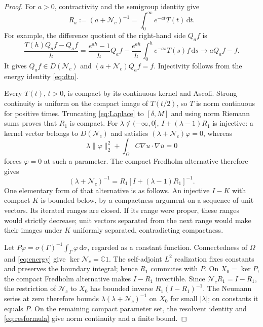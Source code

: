 \documentclass[11pt]{article}
\newcommand{\C}{\mathbb C}
\newcommand{\Nc}{\mathcal N_c}
\newcommand{\dd}{\,\mathrm d}
\newcommand{\norm}[1]{\lVert #1\rVert}
\newcommand{\abs}[1]{\lvert #1\rvert}
\begin{document}
\begin{proof}
For $a>0$, contractivity and the semigroup identity give
\begin{equation}\label{eq:Laplace}
 R_a:=(a+\Nc)^{-1}=\int_0^\infty e^{-at}T(t)\dd t.
\end{equation}
For example, the difference quotient of the right-hand side $Q_af$ is
\[
 \frac{T(h)Q_af-Q_af}{h}
 =\frac{e^{ah}-1}{h}Q_af-\frac{e^{ah}}h\int_0^h e^{-as}T(s)f\dd s
 \longrightarrow aQ_af-f.
\]
It gives $Q_af\in D(\Nc)$ and $(a+\Nc)Q_af=f$. Injectivity follows from
the energy identity \eqref{eq:dtn}.

Every $T(t)$, $t>0$, is compact by its continuous kernel and Ascoli.
Strong continuity is uniform on the compact image of $T(t/2)$, so $T$ is
norm continuous for positive times. Truncating \eqref{eq:Laplace} to
$[\delta,M]$ and using norm Riemann sums proves that $R_1$ is compact.
For $\lambda\notin(-\infty,0]$, $I+(\lambda-1)R_1$ is injective: a kernel
vector belongs to $D(\Nc)$ and satisfies $(\lambda+\Nc)\varphi=0$, whereas
\begin{equation}\label{eq:energy}
 \lambda\norm\varphi_2^2+\int_\Omega C\nabla u\cdot\nabla\overline u=0
\end{equation}
forces $\varphi=0$ at such a parameter.
The compact Fredholm alternative therefore gives
\begin{equation}\label{eq:resformula}
 (\lambda+\Nc)^{-1}=R_1[I+(\lambda-1)R_1]^{-1}.
\end{equation}
One elementary form of that alternative is as follows. An injective $I-K$
with compact $K$ is bounded below, by a compactness argument on a sequence
of unit vectors. Its iterated ranges are closed. If its range were proper,
these ranges would strictly decrease; unit vectors separated from the next
range would make their images under $K$ uniformly separated, contradicting
compactness.

Let $P\varphi=\sigma(\Gamma)^{-1}\int_\Gamma\varphi\dd\sigma$, regarded as a
constant function. Connectedness of $\Omega$ and \eqref{eq:energy} give
$\ker\Nc=\C1$. The self-adjoint $L^2$ realization fixes constants and
preserves the boundary integral; hence $R_1$ commutes with $P$.
On $X_0=\ker P$, the compact Fredholm alternative makes $I-R_1$ invertible.
Since $\Nc R_1=I-R_1$, the restriction of $\Nc$ to $X_0$ has bounded inverse
$R_1(I-R_1)^{-1}$. The Neumann series at zero therefore bounds
$\lambda(\lambda+\Nc)^{-1}$ on $X_0$ for small $\abs\lambda$; on constants
it equals $P$. On the remaining compact parameter set, the resolvent
identity and \eqref{eq:resformula} give norm continuity and a finite bound.
\end{proof}
\end{document}
